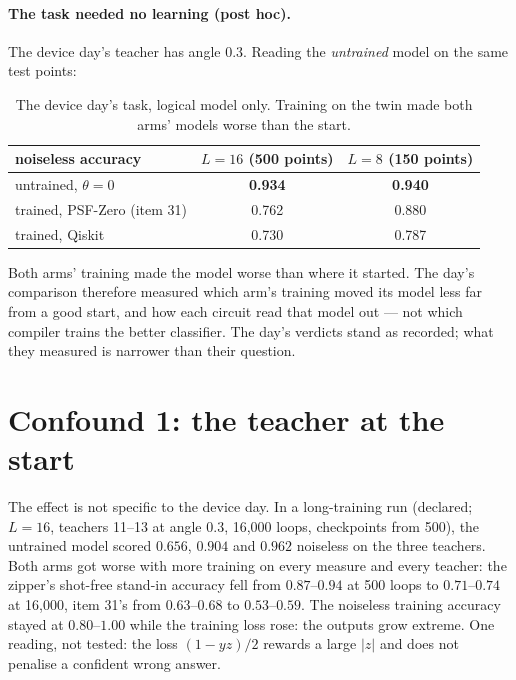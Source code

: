 \documentclass[11pt]{article}
\begin{document}
\paragraph{The task needed no learning (post hoc).} The device day's teacher has angle $0.3$. Reading the
\emph{untrained} model on the same test points:

\begin{table}[h]
\centering
\small
\begin{tabular}{lcc}
\toprule
noiseless accuracy & $L = 16$ (500 points) & $L = 8$ (150 points) \\
\midrule
untrained, $\theta = 0$ & \textbf{0.934} & \textbf{0.940} \\
trained, PSF-Zero (item 31) & 0.762 & 0.880 \\
trained, Qiskit & 0.730 & 0.787 \\
\bottomrule
\end{tabular}
\caption{The device day's task, logical model only. Training on the twin made both arms' models worse than the start.}
\label{tab:theta0device}
\end{table}

Both arms' training made the model worse than where it started. The day's comparison therefore measured which
arm's training moved its model less far from a good start, and how each circuit read that model out --- not which
compiler trains the better classifier. The day's verdicts stand as recorded; what they measured is narrower than
their question.

\section{Confound 1: the teacher at the start}
\label{sec:nearstart}

The effect is not specific to the device day. In a long-training run (declared; $L = 16$, teachers 11--13 at angle
$0.3$, 16{,}000 loops, checkpoints from 500), the untrained model scored $0.656$, $0.904$ and $0.962$ noiseless on the
three teachers. Both arms got worse with more training on every measure and every teacher: the zipper's shot-free
stand-in accuracy fell from $0.87$--$0.94$ at 500 loops to $0.71$--$0.74$ at 16{,}000, item 31's from $0.63$--$0.68$
to $0.53$--$0.59$. The noiseless training accuracy stayed at $0.80$--$1.00$ while the training loss rose: the outputs
grow extreme. One reading, not tested: the loss $(1 - yz)/2$ rewards a large $|z|$ and does not penalise a confident
wrong answer.
\end{document}
